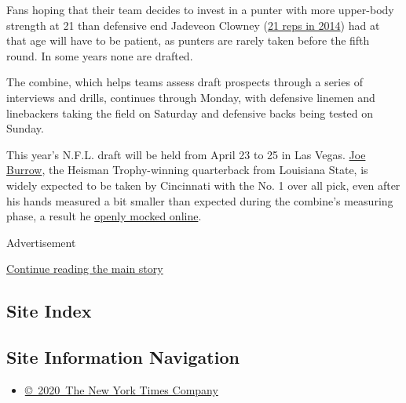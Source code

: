 Fans hoping that their team decides to invest in a punter with more
upper-body strength at 21 than defensive end Jadeveon Clowney
(\href{https://www.pro-football-reference.com/draft/2014-combine.htm}{21
reps in 2014}) had at that age will have to be patient, as punters are
rarely taken before the fifth round. In some years none are drafted.

The combine, which helps teams assess draft prospects through a series
of interviews and drills, continues through Monday, with defensive
linemen and linebackers taking the field on Saturday and defensive backs
being tested on Sunday.

This year's N.F.L. draft will be held from April 23 to 25 in Las Vegas.
\href{https://www.nytimes3xbfgragh.onion/2020/01/13/sports/as-joe-burrow-spoke-of-hunger-his-hometown-felt-the-lift.html}{Joe
Burrow}, the Heisman Trophy-winning quarterback from Louisiana State, is
widely expected to be taken by Cincinnati with the No. 1 over all pick,
even after his hands measured a bit smaller than expected during the
combine's measuring phase, a result he
\href{https://twitter.com/Joe_Burrow10/status/1232071931249254402}{openly
mocked online}.

Advertisement

\protect\hyperlink{after-bottom}{Continue reading the main story}

\hypertarget{site-index}{%
\subsection{Site Index}\label{site-index}}

\hypertarget{site-information-navigation}{%
\subsection{Site Information
Navigation}\label{site-information-navigation}}

\begin{itemize}
\tightlist
\item
  \href{https://help.nytimes3xbfgragh.onion/hc/en-us/articles/115014792127-Copyright-notice}{©~2020~The
  New York Times Company}
\end{itemize}

